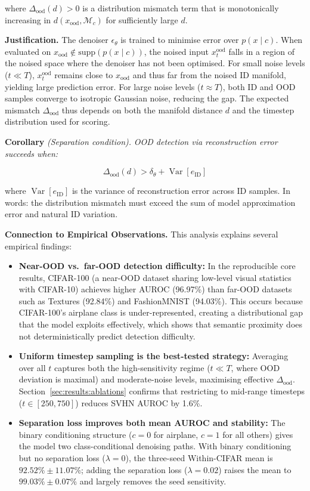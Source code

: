 where $\Delta_{\text{ood}}(d) > 0$ is a distribution mismatch term that is monotonically increasing in $d(x_{\text{ood}}, \mathcal{M}_c)$ for sufficiently large $d$.

\textbf{Justification.} The denoiser $\epsilon_\theta$ is trained to minimise error over $p(x \mid c)$. When evaluated on $x_{\text{ood}} \notin \text{supp}(p(x \mid c))$, the noised input $x_t^{\text{ood}}$ falls in a region of the noised space where the denoiser has not been optimised. For small noise levels ($t \ll T$), $x_t^{\text{ood}}$ remains close to $x_{\text{ood}}$ and thus far from the noised ID manifold, yielding large prediction error. For large noise levels ($t \approx T$), both ID and OOD samples converge to isotropic Gaussian noise, reducing the gap. The expected mismatch $\Delta_{\text{ood}}$ thus depends on both the manifold distance $d$ and the timestep distribution used for scoring.

\textbf{Corollary} \emph{(Separation condition).} \textit{OOD detection via reconstruction error succeeds when:}

\begin{equation}
\label{eq:meth:sep_condition}
\Delta_{\text{ood}}(d) > \delta_\theta + \operatorname{Var}[e_{\text{ID}}]
\end{equation}

where $\operatorname{Var}[e_{\text{ID}}]$ is the variance of reconstruction error across ID samples. In words: the distribution mismatch must exceed the sum of model approximation error and natural ID variation.

\textbf{Connection to Empirical Observations.} This analysis explains several empirical findings:
\begin{itemize}
    \item \textbf{Near-OOD vs.\ far-OOD detection difficulty:} In the reproducible core results, CIFAR-100 (a near-OOD dataset sharing low-level visual statistics with CIFAR-10) achieves higher AUROC (96.97\%) than far-OOD datasets such as Textures (92.84\%) and FashionMNIST (94.03\%). This occurs because CIFAR-100's airplane class is under-represented, creating a distributional gap that the model exploits effectively, which shows that semantic proximity does not deterministically predict detection difficulty.
    \item \textbf{Uniform timestep sampling is the best-tested strategy:} Averaging over all $t$ captures both the high-sensitivity regime ($t \ll T$, where OOD deviation is maximal) and moderate-noise levels, maximising effective $\Delta_{\text{ood}}$. Section~\ref{sec:results:ablations} confirms that restricting to mid-range timesteps ($t \in [250, 750]$) reduces SVHN AUROC by 1.6\%.
    \item \textbf{Separation loss improves both mean AUROC and stability:} The binary conditioning structure ($c{=}0$ for airplane, $c{=}1$ for all others) gives the model two class-conditional denoising paths. With binary conditioning but no separation loss ($\lambda = 0$), the three-seed Within-CIFAR mean is $92.52\% \pm 11.07\%$; adding the separation loss ($\lambda = 0.02$) raises the mean to $99.03\% \pm 0.07\%$ and largely removes the seed sensitivity.
\end{itemize}

